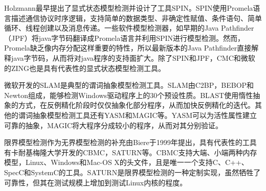 Holzmann最早提出了显式状态模型检测并设计了工具SPIN。SPIN使用Promela语言描述通信协议时序逻辑，支持简单的数据类型、非确定性赋值、条件语句、简单循环、线程创建以及消息传递。一些软件模型检测器，如早期的Java Pathfinder（JPF）将java字节码翻译成Promela语言并利用SPIN进行模型检测。然而，Promela缺乏像内存分配这样重要的特性，所以最新版本的Java Pathfinder直接解释java字节码，从而将对java程序的支持面扩大。除了SPIN和JPF，CMC和微软的ZING也是具有代表性的显式状态模型检测工具。

微软开发的SLAM是典型的谓词抽象模型检测工具。SLAM由C2BP，BEBOP和Newton组成，能够检测Windows驱动程序上的30个预设性质。BLAST使用惰性抽象的方式，在反例精化阶段时仅仅抽象化部分程序，从而加快反例精化的迭代。其他的谓词抽象模型检测工具还有YASM和MAGIC等。YASM可以为活性属性建立可靠的抽象，MAGIC将大程序分成较小的程序，从而对其分别验证。

限界模型检测作为无界模型检测的补充由Biere于1999年提出，具有代表性的工具有卡耐基梅隆大学开发的CBMC，SATURN等。CBMC支持大端、小端两种内存模型，Linux、Windows和Mac-OS X的头文件，且是唯一一个支持C、C++、SpecC和SystemC的工具。SATURN是限界模型检测的一种定制实现，虽然牺牲了可靠性，但其在测试规模上增加到测试Linux内核的程度。

